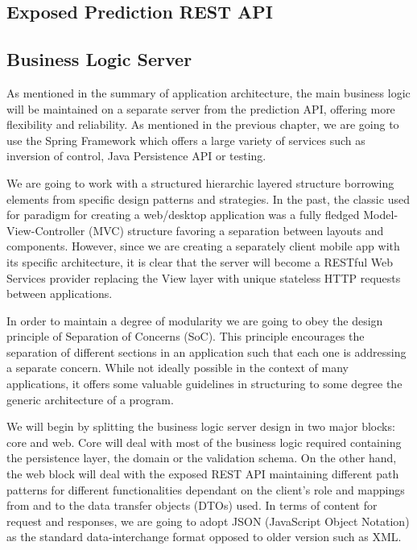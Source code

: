 \subsection{Exposed Prediction REST API}

\subsection{Business Logic Server}

As mentioned in the summary of application architecture, the main business logic will be maintained on a separate server  from the prediction API, offering more flexibility and reliability. As mentioned in the previous chapter, we are going to use the Spring Framework which offers a large variety of services such as inversion of control, Java Persistence API or testing.

We are going to work with a structured hierarchic layered structure borrowing elements from specific design patterns and strategies. In the past, the classic used for paradigm for creating a web/desktop application was a fully fledged Model-View-Controller (MVC) structure favoring a separation between layouts and components. However, since we are creating a separately client mobile app with its specific architecture, it is clear that the server will become a RESTful Web Services provider replacing the View layer with unique stateless HTTP requests between applications.

In order to maintain a degree of modularity we are going to obey the design principle of Separation of Concerns (SoC). This principle encourages the separation of different sections in an application such that each one is addressing a separate concern. While not ideally possible in the context of many applications, it offers some valuable guidelines in structuring to some degree the generic architecture of a program.

We will begin by splitting the business logic server design in two major blocks: core and web. Core will deal with most of the business logic required containing the persistence layer, the domain or the validation schema. On the other hand, the web block will deal with the exposed REST API maintaining different path patterns for different functionalities dependant on the client's role and mappings from and to the data transfer objects (DTOs) used. In terms of content for request and responses, we are going to adopt JSON (JavaScript Object Notation) as the standard data-interchange format opposed to older version such as XML.

